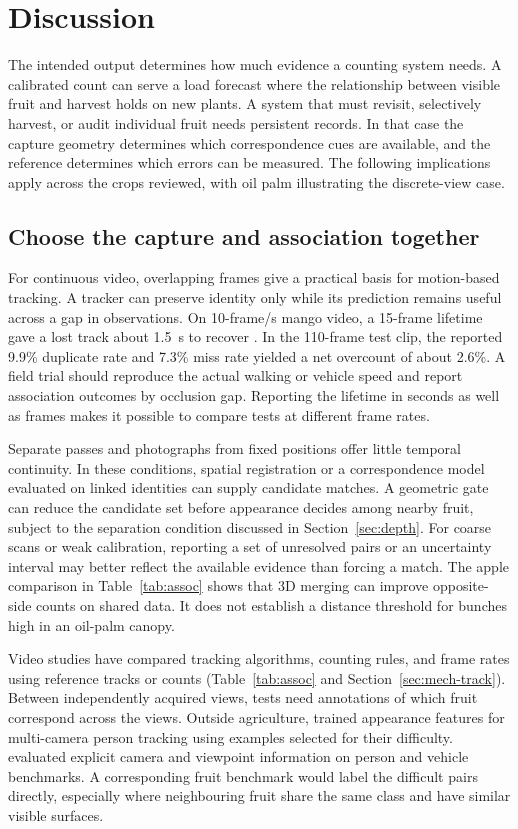 \section{Discussion}\label{sec:agenda}

The intended output determines how much evidence a counting system needs. A calibrated count can serve a load forecast where the relationship between visible fruit and harvest holds on new plants. A system that must revisit, selectively harvest, or audit individual fruit needs persistent records. In that case the capture geometry determines which correspondence cues are available, and the reference determines which errors can be measured. The following implications apply across the crops reviewed, with oil palm illustrating the discrete-view case.

\subsection{Choose the capture and association together}

For continuous video, overlapping frames give a practical basis for motion-based tracking. A tracker can preserve identity only while its prediction remains useful across a gap in observations. On 10-frame/s mango video, a 15-frame lifetime gave a lost track about 1.5~s to recover \citep{wang2019mango}. In the 110-frame test clip, the reported 9.9\% duplicate rate and 7.3\% miss rate yielded a net overcount of about 2.6\%. A field trial should reproduce the actual walking or vehicle speed and report association outcomes by occlusion gap. Reporting the lifetime in seconds as well as frames makes it possible to compare tests at different frame rates.

Separate passes and photographs from fixed positions offer little temporal continuity. In these conditions, spatial registration or a correspondence model evaluated on linked identities can supply candidate matches. A geometric gate can reduce the candidate set before appearance decides among nearby fruit, subject to the separation condition discussed in Section~\ref{sec:depth}. For coarse scans or weak calibration, reporting a set of unresolved pairs or an uncertainty interval may better reflect the available evidence than forcing a match. The apple comparison in Table~\ref{tab:assoc} shows that 3D merging can improve opposite-side counts on shared data. It does not establish a distance threshold for bunches high in an oil-palm canopy.

Video studies have compared tracking algorithms, counting rules, and frame rates using reference tracks or counts (Table~\ref{tab:assoc} and Section~\ref{sec:mech-track}). Between independently acquired views, tests need annotations of which fruit correspond across the views. Outside agriculture, \citet{ristani2018features} trained appearance features for multi-camera person tracking using examples selected for their difficulty. \citet{he2021transreid} evaluated explicit camera and viewpoint information on person and vehicle benchmarks. A corresponding fruit benchmark would label the difficult pairs directly, especially where neighbouring fruit share the same class and have similar visible surfaces.

